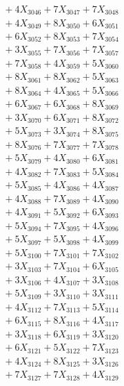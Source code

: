 \documentclass[a4paper,10pt]{article}
\begin{document}
{\begin{align}
&\;  + 4 X_{3046} + 7 X_{3047} + 7 X_{3048} \\[0.3ex]
&\;  + 4 X_{3049} + 8 X_{3050} + 6 X_{3051} \\[0.3ex]
&\;  + 6 X_{3052} + 8 X_{3053} + 7 X_{3054} \\[0.3ex]
&\;  + 3 X_{3055} + 7 X_{3056} + 7 X_{3057} \\[0.3ex]
&\;  + 7 X_{3058} + 4 X_{3059} + 5 X_{3060} \\[0.3ex]
&\;  + 8 X_{3061} + 8 X_{3062} + 5 X_{3063} \\[0.3ex]
&\;  + 8 X_{3064} + 4 X_{3065} + 5 X_{3066} \\[0.3ex]
&\;  + 6 X_{3067} + 6 X_{3068} + 8 X_{3069} \\[0.5ex]\allowbreak
&\;  + 3 X_{3070} + 6 X_{3071} + 8 X_{3072} \\[0.3ex]
&\;  + 5 X_{3073} + 3 X_{3074} + 8 X_{3075} \\[0.3ex]
&\;  + 8 X_{3076} + 7 X_{3077} + 7 X_{3078} \\[0.3ex]
&\;  + 5 X_{3079} + 4 X_{3080} + 6 X_{3081} \\[0.3ex]
&\;  + 4 X_{3082} + 7 X_{3083} + 5 X_{3084} \\[0.3ex]
&\;  + 5 X_{3085} + 4 X_{3086} + 4 X_{3087} \\[0.3ex]
&\;  + 4 X_{3088} + 7 X_{3089} + 4 X_{3090} \\[0.3ex]
&\;  + 4 X_{3091} + 5 X_{3092} + 6 X_{3093} \\[0.3ex]
&\;  + 5 X_{3094} + 7 X_{3095} + 4 X_{3096} \\[0.3ex]
&\;  + 5 X_{3097} + 5 X_{3098} + 4 X_{3099} \\[0.5ex]\allowbreak
&\;  + 5 X_{3100} + 7 X_{3101} + 7 X_{3102} \\[0.3ex]
&\;  + 3 X_{3103} + 7 X_{3104} + 6 X_{3105} \\[0.3ex]
&\;  + 3 X_{3106} + 4 X_{3107} + 3 X_{3108} \\[0.3ex]
&\;  + 5 X_{3109} + 3 X_{3110} + 3 X_{3111} \\[0.3ex]
&\;  + 4 X_{3112} + 7 X_{3113} + 5 X_{3114} \\[0.3ex]
&\;  + 6 X_{3115} + 8 X_{3116} + 4 X_{3117} \\[0.3ex]
&\;  + 3 X_{3118} + 6 X_{3119} + 3 X_{3120} \\[0.3ex]
&\;  + 6 X_{3121} + 5 X_{3122} + 7 X_{3123} \\[0.3ex]
&\;  + 4 X_{3124} + 8 X_{3125} + 3 X_{3126} \\[0.3ex]
&\;  + 7 X_{3127} + 7 X_{3128} + 4 X_{3129} \\[0.5ex]\allowbreak

\end{align}}
\end{document}
